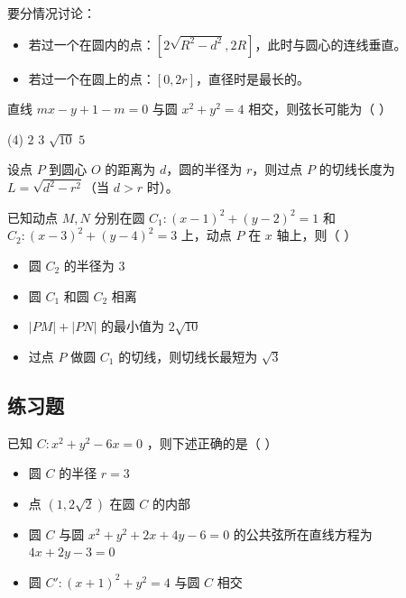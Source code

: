 \vspace{4em}

\begin{theorem}[弦长的取值范围]
    要分情况讨论：
    \begin{itemize}
        \item 若过一个在圆内的点：$[2\sqrt{R^2-d^2}, 2R]$，此时与圆心的连线垂直。
        \item 若过一个在圆上的点：$[0, 2r]$，直径时是最长的。
    \end{itemize}
\end{theorem}

\begin{example}
    直线 $m x-y+1-m=0$ 与圆 $x^2+y^2=4$ 相交，则弦长可能为（ \hspace{2em} ）
    \begin{tasks}(4)
        \task $2$
        \task $3$
        \task $\sqrt{10}$
        \task $5$
    \end{tasks}
\end{example}

\vspace{4em}

\begin{theorem}[圆的切线长度]
    设点 $P$ 到圆心 $O$ 的距离为 $d$，圆的半径为 $r$，则过点 $P$ 的切线长度为 $L = \sqrt{d^2 - r^2}$（当 $d > r$ 时）。
\end{theorem}

\begin{example}
    已知动点 $M, N$ 分别在圆 $C_1:(x-1)^2+(y-2)^2=1$ 和 $C_2:(x-3)^2+(y-4)^2=3$ 上，动点 $P$ 在 $x$ 轴上，则（ \hspace{2em} ）
    \begin{itemize}
        \item  圆 $C_2$ 的半径为 3
        \item  圆 $C_1$ 和圆 $C_2$ 相离
        \item  $|P M|+|P N|$ 的最小值为 $2 \sqrt{10}$
        \item  过点 $P$ 做圆 $C_1$ 的切线，则切线长最短为 $\sqrt{3}$
    \end{itemize}
\end{example}

\vspace{4em}

\subsection*{练习题}

\begin{example}
    已知 $C: x^2+y^2-6 x=0$ ，则下述正确的是（ \hspace{2em} ）
    \begin{itemize}
        \item 圆 $C$ 的半径 $r=3$
        \item 点 $(1,2 \sqrt{2})$ 在圆 $C$ 的内部
        \item 圆 $C$ 与圆 $x^2+y^2+2 x+4 y-6=0$ 的公共弦所在直线方程为 $4 x+2 y-3=0$
        \item 圆 $C':(x+1)^2+y^2=4$ 与圆 $C$ 相交
    \end{itemize}
\end{example}

